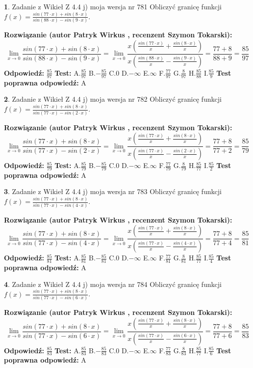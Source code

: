 \documentclass[12pt, a4paper]{article}
\theoremstyle{definition} %
\newtheorem{zad}{}
\newcommand{\zadStart}[1]{\begin{zad}#1\newline}
\newcommand{\zadStop}{\end{zad}}
\newcommand{\rozwStart}[2]{\noindent \textbf{Rozwiązanie (autor #1 , recenzent #2): }\newline}
\newcommand{\rozwStop}{\newline}
\newcommand{\odpStart}{\noindent \textbf{Odpowiedź:}\newline}
\newcommand{\odpStop}{\newline}
\newcommand{\testStart}{\noindent \textbf{Test:}\newline}
\newcommand{\testStop}{\newline}
\newcommand{\kluczStart}{\noindent \textbf{Test poprawna odpowiedź:}\newline}
\newcommand{\kluczStop}{\newline}
\begin{document}
\zadStart{Zadanie z Wikieł Z 4.4 j) moja wersja nr 781}
Obliczyć granicę funkcji $f(x)=\frac{sin(77\cdot x) +sin(8\cdot x)}{sin(88\cdot x) -sin(9\cdot x)}$.
\zadStop
\rozwStart{Patryk Wirkus}{Szymon Tokarski}
$$\lim\limits_{x\to 0}\frac{sin(77\cdot x) +sin(8\cdot x)}{sin(88\cdot x) -sin(9\cdot x)}=\lim\limits_{x\to 0}\frac{x(\frac{sin(77\cdot x)}{x}+\frac{sin(8\cdot x)}{x})}{x(\frac{sin(88\cdot x)}{x}-\frac{sin(9\cdot x)}{x})}=\frac{77+8}{88+9} = \frac{85}{97}$$
\rozwStop
\odpStart
$\frac{85}{97}$
\odpStop
\testStart
A.$\frac{85}{97}$
B.$-\frac{85}{97}$
C.$0$
D.$-\infty$
E.$\infty$
F.$\frac{77}{97}$
G.$\frac{8}{97}$
H.$\frac{85}{88}$
I.$\frac{85}{9}$
\testStop
\kluczStart
A
\kluczStop



\zadStart{Zadanie z Wikieł Z 4.4 j) moja wersja nr 782}
Obliczyć granicę funkcji $f(x)=\frac{sin(77\cdot x) +sin(8\cdot x)}{sin(77\cdot x) -sin(2\cdot x)}$.
\zadStop
\rozwStart{Patryk Wirkus}{Szymon Tokarski}
$$\lim\limits_{x\to 0}\frac{sin(77\cdot x) +sin(8\cdot x)}{sin(77\cdot x) -sin(2\cdot x)}=\lim\limits_{x\to 0}\frac{x(\frac{sin(77\cdot x)}{x}+\frac{sin(8\cdot x)}{x})}{x(\frac{sin(77\cdot x)}{x}-\frac{sin(2\cdot x)}{x})}=\frac{77+8}{77+2} = \frac{85}{79}$$
\rozwStop
\odpStart
$\frac{85}{79}$
\odpStop
\testStart
A.$\frac{85}{79}$
B.$-\frac{85}{79}$
C.$0$
D.$-\infty$
E.$\infty$
F.$\frac{77}{79}$
G.$\frac{8}{79}$
H.$\frac{85}{77}$
I.$\frac{85}{2}$
\testStop
\kluczStart
A
\kluczStop



\zadStart{Zadanie z Wikieł Z 4.4 j) moja wersja nr 783}
Obliczyć granicę funkcji $f(x)=\frac{sin(77\cdot x) +sin(8\cdot x)}{sin(77\cdot x) -sin(4\cdot x)}$.
\zadStop
\rozwStart{Patryk Wirkus}{Szymon Tokarski}
$$\lim\limits_{x\to 0}\frac{sin(77\cdot x) +sin(8\cdot x)}{sin(77\cdot x) -sin(4\cdot x)}=\lim\limits_{x\to 0}\frac{x(\frac{sin(77\cdot x)}{x}+\frac{sin(8\cdot x)}{x})}{x(\frac{sin(77\cdot x)}{x}-\frac{sin(4\cdot x)}{x})}=\frac{77+8}{77+4} = \frac{85}{81}$$
\rozwStop
\odpStart
$\frac{85}{81}$
\odpStop
\testStart
A.$\frac{85}{81}$
B.$-\frac{85}{81}$
C.$0$
D.$-\infty$
E.$\infty$
F.$\frac{77}{81}$
G.$\frac{8}{81}$
H.$\frac{85}{77}$
I.$\frac{85}{4}$
\testStop
\kluczStart
A
\kluczStop



\zadStart{Zadanie z Wikieł Z 4.4 j) moja wersja nr 784}
Obliczyć granicę funkcji $f(x)=\frac{sin(77\cdot x) +sin(8\cdot x)}{sin(77\cdot x) -sin(6\cdot x)}$.
\zadStop
\rozwStart{Patryk Wirkus}{Szymon Tokarski}
$$\lim\limits_{x\to 0}\frac{sin(77\cdot x) +sin(8\cdot x)}{sin(77\cdot x) -sin(6\cdot x)}=\lim\limits_{x\to 0}\frac{x(\frac{sin(77\cdot x)}{x}+\frac{sin(8\cdot x)}{x})}{x(\frac{sin(77\cdot x)}{x}-\frac{sin(6\cdot x)}{x})}=\frac{77+8}{77+6} = \frac{85}{83}$$
\rozwStop
\odpStart
$\frac{85}{83}$
\odpStop
\testStart
A.$\frac{85}{83}$
B.$-\frac{85}{83}$
C.$0$
D.$-\infty$
E.$\infty$
F.$\frac{77}{83}$
G.$\frac{8}{83}$
H.$\frac{85}{77}$
I.$\frac{85}{6}$
\testStop
\kluczStart
A
\kluczStop
\end{document}
